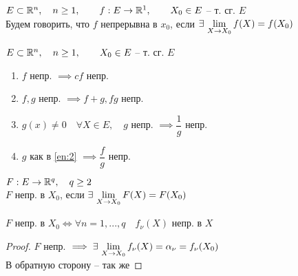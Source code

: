 \begin{definition}
	$ E \subset \mathbb{R}^n, \quad n \ge 1, \qquad f : E \to \mathbb{R}^1, \qquad X_0 \in E $ -- т. сг. $ E $ \\
	Будем говорить, что $ f $ непрерывна в $ x_0 $, если $ \exists\, \lim\limits_{X \to X_0} f(X) = f(X_0) $
\end{definition}

\begin{properties}
	$ E \subset \mathbb{R}^n, \quad n \ge 1, \qquad X_0 \in E $ -- т. сг. $ E $
	\begin{enumerate}
		\item $ f $ непр. $ \implies cf $ непр.
		\item $ f, g $ непр. $ \implies f + g, fg $ непр.
		\item \label{en:2} $ g(x) \ne 0 \quad \forall X \in E, \quad g $ непр. $ \implies \dfrac1g $ непр.
		\item $ g $ как в \ref{en:2} $ \implies \dfrac{f}g $ непр.
	\end{enumerate}
\end{properties}

\begin{definition}
	$ F : E \to \mathbb{R}^q, \quad q \ge 2 $ \\
	$ F $ непр. в $ X_0 $, если $ \exists\, \lim\limits_{X \to X_0} F(X) = F(X_0) $
\end{definition}

\begin{statement}
	$ F $ непр. в $ X_0 \iff \forall n = 1, ..., q \quad f_\nu(X) $ непр. в $ X $
\end{statement}

\begin{proof}
	$ F $ непр. $ \implies \exists\, \lim\limits_{X \to X_0} f_\nu(X) = \alpha_\nu = f_\nu(X_0) $ \\
	В обратную сторону -- так же
\end{proof}
